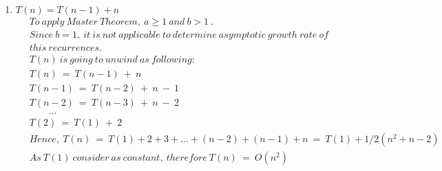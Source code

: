 \documentclass[a4paper]{scrartcl}
\begin{document}
\begin{enumerate}[label=(\alph*)]
\item $T (n) = T (n - 1) + n$
\begin{align*}
  &\ To\ apply\ Master\ Theorem,\ a \geq 1\ and\ b > 1\ .\\ &\
  Since\ b = 1,\ it\ is\ not\ applicable\ to\ determine\ asymptotic\ growth\ rate\ of\\ &\
  this\ recurrences.\\ &\
  T(n)\ is\ going\ to\ unwind\ as\ following:\\ &\
  T(n)\ =\ T(n-1)\ +\ n\\ &\
  T(n-1)\ =\ T(n-2)\ +\ n\ -\ 1\\ &\
  T(n-2)\ =\ T(n-3)\ +\ n\ -\ 2\\ &\
  \qquad ...\\ &\
  T(2)\ =\ T(1)\ +\ 2\\ &\
  Hence,\ T(n)\ =\ T(1)+2+3+...+(n-2)+(n-1)+n\ =\ T(1)+1/2(n^2+n-2)\\ &\
  As\ T(1)\ consider\ as\ constant,\ therefore\ T(n)\ =\ O(n^2)
\end{align*}
\end{enumerate}
\end{document}
